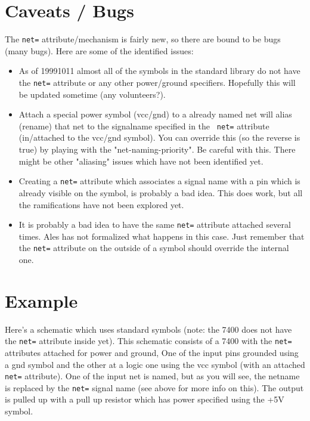 \documentclass{article}
\begin{document}
\section{Caveats / Bugs}
The {\tt net=} attribute/mechanism is fairly new, so there are bound
to be bugs (many bugs).  Here are some of the identified issues:
\begin{itemize}
\item As of 19991011 almost all of the symbols in the standard library
do not have the {\tt net=} attribute or any other power/ground
specifiers.  Hopefully this will be updated sometime (any
volunteers?).

\item Attach a special power symbol (vcc/gnd) to a already named net
will alias (rename) that net to the signalname specified in the {\tt
net=} attribute (in/attached to the vcc/gnd symbol).  You can override
this (so the reverse is true) by playing with the
"net-naming-priority".  Be careful with this.  There might be other
"aliasing" issues which have not been identified yet.

\item Creating a {\tt net=} attribute which associates a signal name
with a pin which is already visible on the symbol, is probably a bad
idea.  This does work, but all the ramifications have not been
explored yet.

\item It is probably a bad idea to have the same {\tt net=} attribute
attached several times.  Ales has not formalized what happens in this
case.  Just remember that the {\tt net=} attribute on the outside of a
symbol should override the internal one.
\end{itemize}

\section{Example}
Here's a schematic which uses standard symbols (note: the 7400 does
not have the {\tt net=} attribute inside yet).  This schematic
consists of a 7400 with the {\tt net=} attributes attached for power
and ground, One of the input pins grounded using a gnd symbol and the
other at a logic one using the vcc symbol (with an attached {\tt net=}
attribute).  One of the input net is named, but as you will see, the
netname is replaced by the {\tt net=} signal name (see above for more
info on this).  The output is pulled up with a pull up resistor which
has power specified using the +5V symbol.
\end{document}
